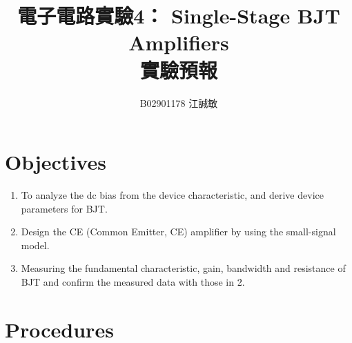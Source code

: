 \documentclass[12pt, a4paper]{article}
\title{ \bf {\huge 電子電路實驗4： Single-Stage BJT Amplifiers }\\ 實驗預報}
\author{B02901178 江誠敏}
\begin{document}
\maketitle

\section{Objectives}
\begin{enumerate}
  \item To analyze the dc bias from the device characteristic, and derive device
    parameters for BJT.
  \item Design the CE (Common Emitter, CE) amplifier by using the small-signal
        model.
  \item Measuring the fundamental characteristic, gain, bandwidth and resistance of
        BJT and confirm the measured data with those in 2. 
\end{enumerate}


\section{Procedures}
\end{document}
